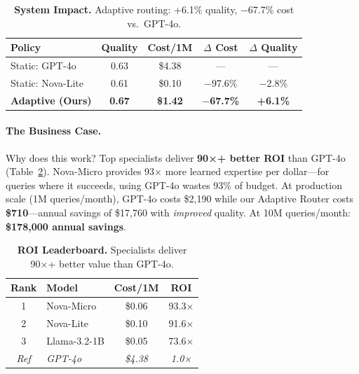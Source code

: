 \begin{table}[t]
\centering
\small
\caption{\textbf{System Impact.} Adaptive routing: +6.1\% quality, $-$67.7\% cost vs.\ GPT-4o.}
\label{tab:system_impact}
\begin{tabular}{lcccc}
\toprule
\textbf{Policy} & \textbf{Quality} & \textbf{Cost/1M} & \textbf{$\Delta$ Cost} & \textbf{$\Delta$ Quality} \\
\midrule
Static: GPT-4o & 0.63 & \$4.38 & --- & --- \\
Static: Nova-Lite & 0.61 & \$0.10 & $-$97.6\% & $-$2.8\% \\
\midrule
\textbf{Adaptive (Ours)} & \textbf{0.67} & \textbf{\$1.42} & \textbf{$-$67.7\%} & \textbf{+6.1\%} \\
\bottomrule
\end{tabular}
\end{table}

\paragraph{The Business Case.} Why does this work? Top specialists deliver \textbf{90×+ better ROI} than GPT-4o (Table~\ref{tab:roi}). Nova-Micro provides 93× more learned expertise per dollar---for queries where it succeeds, using GPT-4o wastes 93\% of budget. At production scale (1M queries/month), GPT-4o costs \$2,190 while our Adaptive Router costs \textbf{\$710}---annual savings of \$17,760 with \emph{improved} quality. At 10M queries/month: \textbf{\$178,000 annual savings}.

\begin{table}[t]
\centering
\small
\caption{\textbf{ROI Leaderboard.} Specialists deliver 90×+ better value than GPT-4o.}
\label{tab:roi}
\begin{tabular}{clcc}
\toprule
\textbf{Rank} & \textbf{Model} & \textbf{Cost/1M} & \textbf{ROI} \\
\midrule
1 & Nova-Micro & \$0.06 & 93.3× \\
2 & Nova-Lite & \$0.10 & 91.6× \\
3 & Llama-3.2-1B & \$0.05 & 73.6× \\
\midrule
\textit{Ref} & \textit{GPT-4o} & \textit{\$4.38} & \textit{1.0×} \\
\bottomrule
\end{tabular}
\end{table}
